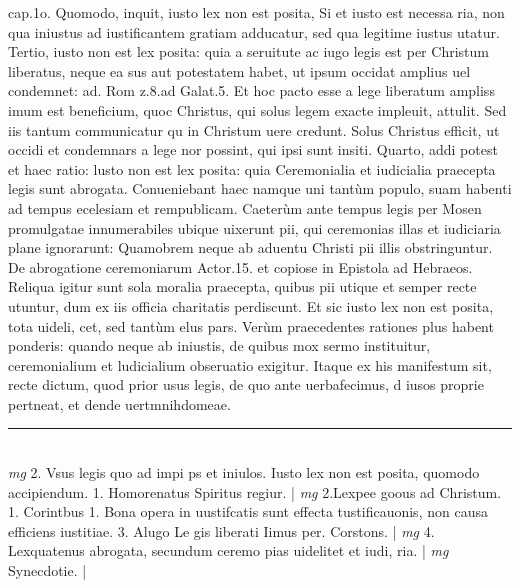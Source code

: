 \documentclass{article}
\begin{document}
\begin{pages}
cap.1o. Quomodo, inquit, iusto lex non est posita, Si et iusto est necessa ria, non qua iniustus ad iustificantem gratiam adducatur, sed qua legitime iustus utatur.  \pend\pstart Tertio, iusto non est lex posita: quia a seruitute ac iugo legis est per Christum liberatus, neque  ea sus aut potestatem habet, ut ipsum occidat amplius uel condemnet: ad. Rom z.8.ad Galat.5. Et hoc pacto esse a lege liberatum ampliss imum est beneficium, quoc Christus, qui solus legem exacte impleuit, attulit. Sed iis tantum communicatur qu in Christum uere credunt. Solus Christus efficit, ut occidi et condemnars a lege nor possint, qui ipsi sunt insiti.  \pend\pstart Quarto, addi potest et haec ratio: lusto non est lex posita: quia Ceremonialia et iudicialia praecepta legis sunt abrogata. Conueniebant haec namque  uni tantùm populo, suam habenti ad tempus ecelesiam et rempublicam. Caeterùm ante tempus legis per Mosen promulgatae innumerabiles ubique  uixerunt pii, qui ceremonias illas et iudiciaria plane ignorarunt: Quamobrem neque  ab aduentu Christi pii illis obstringuntur. De abrogatione ceremoniarum Actor.15. et copiose in Epistola ad Hebraeos. Reliqua igitur sunt sola moralia praecepta, quibus pii utique et semper recte utuntur, dum ex iis officia charitatis perdiscunt. Et sic iusto lex non est posita, tota uideli, cet, sed tantùm elus pars. Verùm praecedentes rationes plus habent ponderis: quando neque ab iniustis, de quibus mox sermo instituitur, ceremonialium et ludicialium obseruatio exigitur. Itaque ex his manifestum sit, recte dictum, quod prior usus legis, de quo ante uerbafecimus, d iusos proprie pertneat, et dende uertmnihdomeae.  \pend
\vspace{0.5cm}\noindent
\vspace{0.2cm}\rule{1cm}{0.2pt}\\ 
\hspace{0.2cm}\textit{mg}
\footnotesize 2. Vsus legis quo ad impi ps et iniulos. Iusto lex non est posita, quomodo accipiendum. 1. Homorenatus Spiritus regiur. 
\normalsize| 
\hspace{0.2cm}\textit{mg}
\footnotesize 2.Lexpee goous ad Christum. 1. Corintbus 1. Bona opera in uustifcatis sunt effecta tustificauonis, non causa efficiens iustitiae. 3. Alugo Le gis liberati Iimus per. Corstons. 
\normalsize| 
\hspace{0.2cm}\textit{mg}
\footnotesize 4. Lexquatenus abrogata, secundum ceremo pias uidelitet et iudi, ria. 
\normalsize| 
\hspace{0.2cm}\textit{mg}
\footnotesize Synecdotie. 
\normalsize| 

\end{pages}
\end{document}

